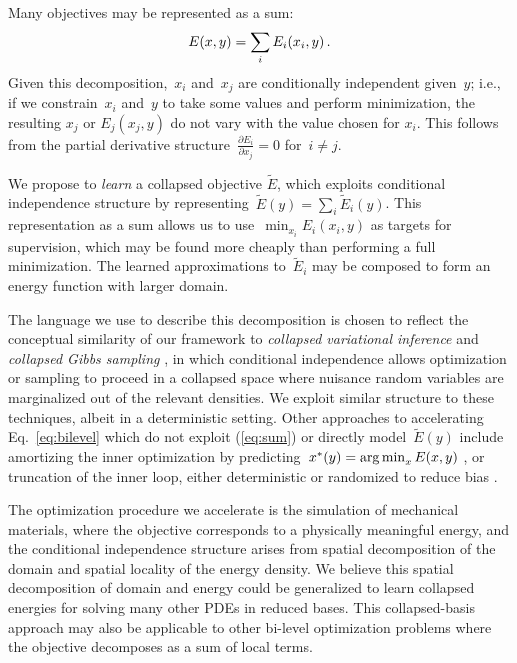 Many objectives may be represented as a sum:
\begin{equation}\label{eq:sum}\small
    E(x, y) = \sum_i E_i(x_i, y)\,.
\end{equation}
Given this decomposition,~$x_i$ and~$x_j$ are conditionally independent given~$y$; i.e., if we constrain~$x_i$ and~$y$ to take some values and perform minimization, the  resulting $x_j$ or $E_j(x_j, y)$ do not vary with the value chosen for $x_i$.
This follows from the partial derivative structure~${\frac{\partial{E_i}}{\partial x_j} = 0}$ for~${i\neq j}$.

We propose to \emph{learn} a collapsed objective $\tilde{E}$, which exploits conditional independence structure by representing~${\tilde{E}(y) = \sum_i \tilde{E}_i(y)}$.
This representation as a sum allows us to use~${\min_{x_i} E_i(x_i, y)}$ as targets for supervision, which may be found more cheaply than performing a full minimization.
The learned approximations to~$\tilde{E}_i$ may be composed to form an energy function with larger domain.

The language we use to describe this decomposition is chosen to reflect the conceptual similarity of our framework to \emph{collapsed variational inference} \citep{teh2007collapsed} and \emph{collapsed Gibbs sampling} \citep{geman1984stochastic, liu1994collapsed}, in which conditional independence allows optimization or sampling to proceed in a collapsed space where nuisance random variables are marginalized out of the relevant densities.
We exploit similar structure to these techniques, albeit in a deterministic setting.
Other approaches to accelerating Eq.~\ref{eq:bilevel} which do not exploit (\ref{eq:sum}) or directly model~$\tilde{E}(y)$ include amortizing the inner optimization by predicting~${x^*(y) = \operatorname*{arg\,min}_x E(x, y)}$ \citep{kingma2013auto,brock2017smash}, or truncation of the inner loop, either deterministic \citep{wu2018understanding,shaban2018truncated} or randomized to reduce bias \citep{tallec2017unbiasing,beatson2019efficient}.

The optimization procedure we accelerate is the simulation of mechanical materials, where the objective corresponds to a physically meaningful energy, and the conditional independence structure arises from spatial decomposition of the domain and spatial locality of the energy density.
We believe this spatial decomposition of domain and energy could be generalized to learn collapsed energies for solving many other PDEs in reduced bases.
This collapsed-basis approach may also be applicable to other bi-level optimization problems where the objective decomposes as a sum of local terms.
\vspace{-0.1cm}
